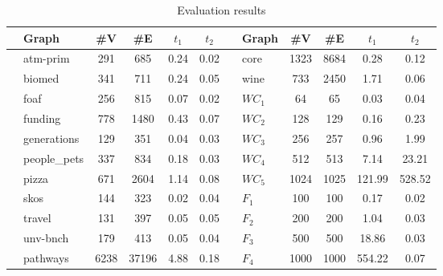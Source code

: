 {\setlength{\tabcolsep}{0.4em}
\begin{table}[ht]
\centering
\caption{Evaluation results}
\label{tbl:tableRDF}
\begin{tabular}{| c | p{1.6cm} | c | c | c | c || c | p{0.8cm} | c | c | c | c |}
    \hline
      &  Graph              & \#V & \#E  & $t_1$  & $t_2$ &  & Graph & \#V & \#E     & $t_1$    & $t_2$ \\
       \hline
       \hline
    \parbox[t]{2mm}{}
      & \small{atm-prim}                    & 291 & 685     & 0.24   & 0.02 & 
     \parbox[t]{2mm}{} & \small{core}                        & 1323 & 8684   & 0.28  &  0.12   \\
      & \small{biomed}                      & 341 & 711     & 0.24  & 0.05 & & \small{wine}                        & 733 & 2450    & 1.71  & 0.06      \\
      & \small{foaf}                        & 256 & 815     & 0.07  & 0.02 & 
      \parbox[t]{2mm}{} & $WC_1$& 64 & 65 & 0.03 & 0.04      \\
      & \small{funding}                     & 778 & 1480    & 0.43  & 0.07 & & $WC_2$ & 128 & 129 & 0.16 & 0.23      \\
      & \small{generations}                 & 129 & 351     & 0.04  & 0.03 & & $WC_3$ & 256 & 257 & 0.96 & 1.99    \\
      & \small{people\_pets}                & 337 & 834     & 0.18  & 0.03 & & $WC_4$ & 512 & 513 & 7.14 & 23.21      \\
      & \small{pizza}                       & 671 & 2604    & 1.14  & 0.08 & & $WC_5$ & 1024& 1025&  121.99 & 528.52      \\ 
      & \small{skos}                        & 144 & 323     & 0.02  & 0.04 & 
      \parbox[t]{2mm}{} & $F_1$ & 100 & 100 & 0.17 &  0.02     \\
      & \small{travel}                      & 131 & 397     & 0.05  & 0.05 & & $F_2$ & 200 & 200 & 1.04 & 0.03        \\
      & \small{unv-bnch}                    & 179 & 413     & 0.05  & 0.04 & & $F_3$ & 500 & 500 & 18.86  & 0.03   \\
      & \small{pathways}                    & 6238 & 37196  & 4.88 &   0.18 & & $F_4$ & 1000 & 1000& 554.22 & 0.07       \\
      \hline
  \end{tabular}
\end{table}
}

